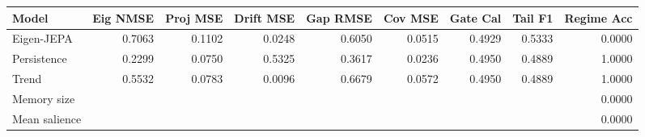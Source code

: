 \begin{tabular}{lrrrrrrrr}
\toprule
Model & Eig NMSE & Proj MSE & Drift MSE & Gap RMSE & Cov MSE & Gate Cal & Tail F1 & Regime Acc \\
\midrule
Eigen-JEPA & 0.7063 & 0.1102 & 0.0248 & 0.6050 & 0.0515 & 0.4929 & 0.5333 & 0.0000 \\
Persistence & 0.2299 & 0.0750 & 0.5325 & 0.3617 & 0.0236 & 0.4950 & 0.4889 & 1.0000 \\
Trend & 0.5532 & 0.0783 & 0.0096 & 0.6679 & 0.0572 & 0.4950 & 0.4889 & 1.0000 \\
\midrule
Memory size & \multicolumn{8}{r}{0.0000} \\
Mean salience & \multicolumn{8}{r}{0.0000} \\
\bottomrule
\end{tabular}